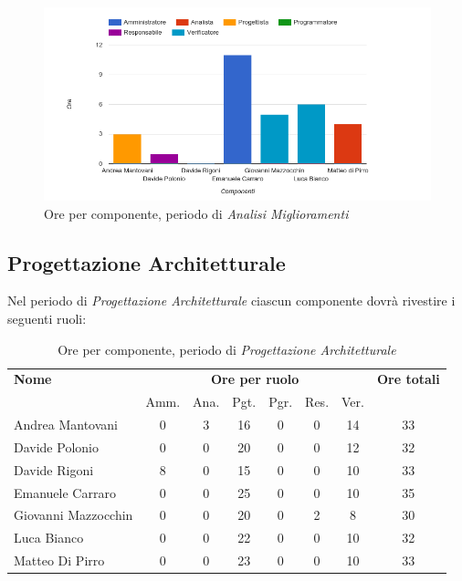     \begin{figure}[H]
      \begin{center}
        \includegraphics[width=15cm]{res/img/suddivisioneRuoloProspettoOrario/orePerComponenteAnalisiMiglioramenti.png}
      \caption{Ore per componente, periodo di \textit{Analisi Miglioramenti}}
      \end{center} 
    \end{figure}    

\pagebreak
\subsection{Progettazione Architetturale}
Nel periodo di \textit{Progettazione Architetturale} ciascun componente dovrà rivestire i seguenti ruoli:

\begin{table}[H]
\begin{tabular}{lccccccc}
\toprule
    \textbf{Nome}  & \multicolumn{6}{c}{\textbf{Ore per ruolo}} & \textbf{Ore totali} \\
     & Amm. & Ana. & Pgt. & Pgr. & Res. & Ver. & \\
    \midrule
    
	   Andrea Mantovani & 0 & 3 & 16 & 0 & 0 & 14 & 33 \\
	     Davide Polonio & 0 & 0 & 20 & 0 & 0 & 12 & 32 \\
	      Davide Rigoni & 8 & 0 & 15 & 0 & 0 & 10 & 33 \\
	   Emanuele Carraro & 0 & 0 & 25 & 0 & 0 & 10 & 35 \\
	Giovanni Mazzocchin & 0 & 0 & 20 & 0 & 2 & 8 & 30 \\
	        Luca Bianco & 0 & 0 & 22 & 0 & 0 & 10 & 32 \\
	    Matteo Di Pirro & 0 & 0 & 23 & 0 & 0 & 10 & 33 \\
    
    \bottomrule
\end{tabular}
\caption{Ore per componente, periodo di \textit{Progettazione Architetturale}}
\end{table}

